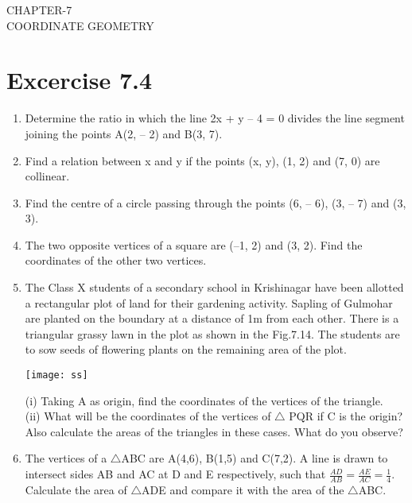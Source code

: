 \documentclass[12pt]{article}
\begin{document}
\begin{center}
\textbf\large{CHAPTER-7 \\ COORDINATE GEOMETRY}

\end{center}
\section*{Excercise 7.4}

\begin{enumerate}
\item Determine the ratio in which the line 2x + y – 4 = 0 divides the line segment joining the points A(2, – 2) and B(3, 7).

\item Find a relation between x and y if the points (x, y), (1, 2) and (7, 0) are collinear.

\item Find the centre of a circle passing through the points (6, – 6), (3, – 7) and (3, 3).

\item The two opposite vertices of a square are (–1, 2) and (3, 2). Find the coordinates of the other two vertices.

\item The Class X students of a secondary school in Krishinagar have been allotted a rectangular plot of land for their gardening activity. Sapling of Gulmohar are planted on the boundary at a distance of 1m from each
other. There is a triangular grassy lawn in the plot as
shown in the Fig.7.14. The students are to sow seeds of
flowering plants on the remaining area of the plot.\\
\begin{center}
\graphicspath{ {/home/annu/Downloads/nursery/} }
\texttt{[image: ss]}
\end{center}

(i) Taking A as origin, find the coordinates of the vertices of the triangle.\\
(ii) What will be the coordinates of the vertices of $\triangle$ PQR if C is the origin?\\
Also calculate the areas of the triangles in these cases. What do you observe?

\item The vertices of a $\triangle$ABC are A(4,6), B(1,5) and C(7,2). A line is drawn to intersect sides AB and AC at D and E respectively, such that $\frac{AD}{AB} = \frac{AE}{AC} = \frac{1}{4}$. Calculate the area of $\triangle$ADE and compare it with the area of the $\triangle$ABC.


\end{enumerate}
\end{document}
